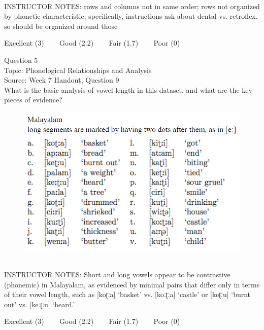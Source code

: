 \documentclass[12pt]{article}
\begin{document}
~\\
INSTRUCTOR NOTES: rows and columns not in same order; rows not organized by phonetic characteristic; specifically, instructions ask about dental vs. retroflex, so should be organized around those


\vfill
Excellent (3) ~~~ Good (2.2) ~~~ Fair (1.7) ~~~ Poor (0)
\newpage

{\large Question 5}\\

Topic: Phonological Relationships and Analysis\\
Source: Week 7 Handout, Question 9\\

What is the basic analysis of vowel length in this dataset, and what are the key pieces of evidence?\\

\begin{figure}[H]
\includegraphics{../images/malayalam.png}
\end{figure}

~\\
INSTRUCTOR NOTES: Short and long vowels appear to be contrastive (phonemic) in Malayalam, as evidenced by minimal pairs that differ only in terms of their vowel length, such as [koʈːa] ‘basket’ vs. [koːʈːa] ‘castle’ or [keʈːu] ‘burnt out’ vs. [keːʈːu] ‘heard.’


\vfill
Excellent (3) ~~~ Good (2.2) ~~~ Fair (1.7) ~~~ Poor (0)
\newpage

\begin{center}
\textbf{{\color{red}{\HUGE END OF EXAM}}}\\

\end{center}
\newpage
\end{document}
